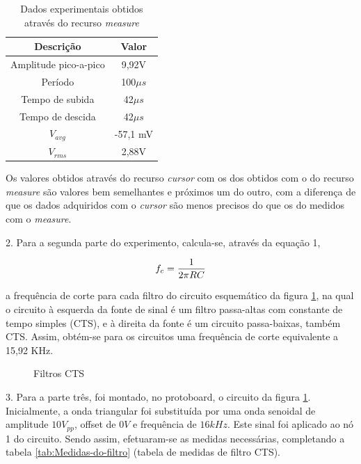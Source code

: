 \documentclass[a4paper]{article} %
\begin{document}
\begin{table}[h]
\begin{centering}
\caption{Dados experimentais obtidos através do recurso \textit{measure} \label{tab:measure}}
\begin{tabular}{cc}
\hline 
Descrição & Valor\tabularnewline
\hline
Amplitude pico-a-pico & 9,92V \tabularnewline
Período & 100$\mu s$\tabularnewline
Tempo de subida & 42$\mu s$\tabularnewline
Tempo de descida  & 42$\mu s$\tabularnewline
$V_{avg}$ & -57,1 mV\tabularnewline
$V_{rms}$ & 2,88V \tabularnewline
\hline
\end{tabular}
\par\end{centering}
\end{table}
Os valores obtidos através do recurso \textit{cursor} com os dos obtidos com o do recurso \textit{measure} são valores bem semelhantes e próximos um do outro, com a diferença de que os dados adquiridos com o \textit{cursor}  são menos precisos do que os do medidos com o \textit{measure}.\\

\newpage

2. Para a segunda parte do experimento, calcula-se, através da equação 1,
\vspace{1mm}

\begin{equation}
 f_{c}=\frac{1}{2\pi RC}\\
\end{equation}

\vspace{2mm}


 a frequência de corte para cada filtro do circuito esquemático da figura \ref{tab:circ}, na qual o circuito à esquerda da fonte de sinal é um filtro passa-altas com constante de tempo simples (CTS), e à direita da fonte é um circuito passa-baixas, também CTS. Assim, obtém-se para os circuitos uma frequência de corte equivalente a 15,92 KHz.


\vspace{3mm}
\begin{figure}[h]
\centerline{}
\caption{Filtros CTS \label{tab:circ}}
\end{figure}

\vspace{2mm}


3. Para a parte três, foi montado, no protoboard, o circuito da figura \ref{tab:circ}. Inicialmente, a onda triangular foi substituída por uma onda senoidal de amplitude $10V_{pp}$, offset de $0V$ e frequência de $16kHz$. Este sinal foi aplicado ao nó 1 do circuito. Sendo assim, efetuaram-se as medidas necessárias, completando a tabela \ref{tab:Medidas-do-filtro} (tabela de medidas de filtro CTS).
\end{document}
